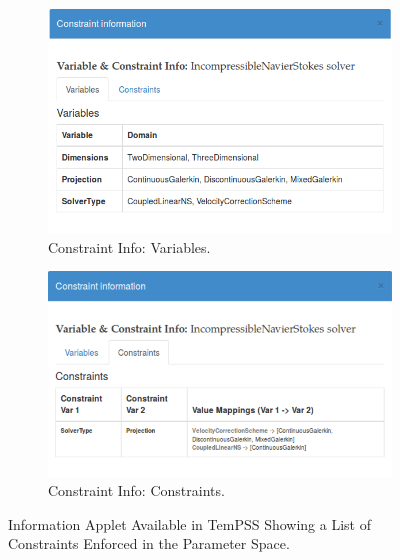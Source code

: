 \documentclass[11pt, a4paper]{report}
\begin{document}
\begin{figure}[htb!]
 \centering
 
 \label{fig:constraints_mapping}
\end{figure}

\begin{figure}[!htb]
\centering
\begin{subfigure}{.5\textwidth}
  \centering
  \includegraphics[width=.9\linewidth]{constraint_info}
  \caption{Constraint Info: Variables.}
  \label{fig:constraint_info}
\end{subfigure}%
\begin{subfigure}{.5\textwidth}
  \centering
  \includegraphics[width=.975\linewidth]{constraint_info_2}
  \caption{Constraint Info: Constraints.}
  \label{fig:constraint_info_2}
\end{subfigure}
\caption{Information Applet Available in TemPSS Showing a List of Constraints Enforced in the Parameter Space.}
\label{fig:constrain}
\end{figure}
\end{document}

